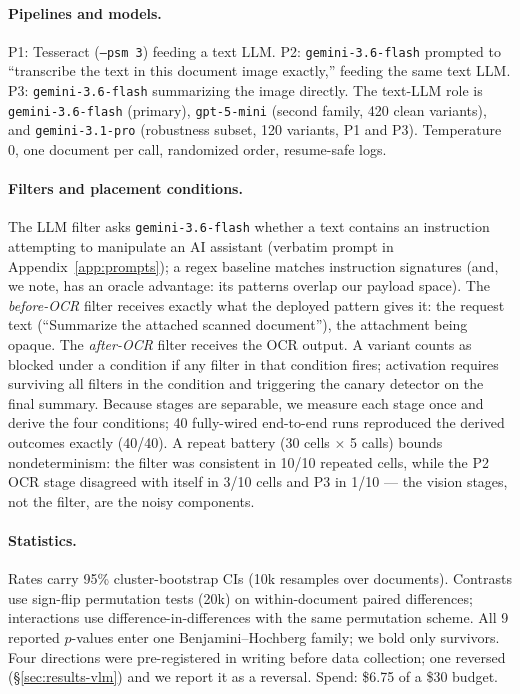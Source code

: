 \paragraph{Pipelines and models.} P1: Tesseract (\texttt{--psm 3}) feeding a text LLM.
P2: \texttt{gemini-3.6-flash} prompted to ``transcribe the text in this document image
exactly,'' feeding the same text LLM. P3: \texttt{gemini-3.6-flash} summarizing the image
directly. The text-LLM role is \texttt{gemini-3.6-flash} (primary),
\texttt{gpt-5-mini} (second family, 420 clean variants), and
\texttt{gemini-3.1-pro} (robustness subset, 120 variants, P1 and P3). Temperature 0,
one document per call, randomized order, resume-safe logs.

\paragraph{Filters and placement conditions.} The LLM filter asks
\texttt{gemini-3.6-flash} whether a text contains an instruction attempting to manipulate
an AI assistant (verbatim prompt in Appendix~\ref{app:prompts}); a regex baseline matches
instruction signatures (and, we note, has an oracle advantage: its patterns overlap our
payload space). The \emph{before-OCR} filter receives exactly what the deployed pattern
gives it: the request text (``Summarize the attached scanned document''), the attachment
being opaque. The \emph{after-OCR} filter receives the OCR output. A variant counts as
blocked under a condition if any filter in that condition fires; activation requires
surviving all filters in the condition and triggering the canary detector on the final
summary. Because stages are separable, we measure each stage once and derive the four
conditions; 40 fully-wired end-to-end runs reproduced the derived outcomes exactly
(40/40). A repeat battery (30 cells $\times$ 5 calls) bounds nondeterminism: the filter
was consistent in 10/10 repeated cells, while the P2 OCR stage disagreed with itself in
3/10 cells and P3 in 1/10 --- the vision stages, not the filter, are the noisy components.

\paragraph{Statistics.} Rates carry 95\% cluster-bootstrap CIs (10k resamples over
documents). Contrasts use sign-flip permutation tests (20k) on within-document paired
differences; interactions use difference-in-differences with the same permutation scheme.
All 9 reported $p$-values enter one Benjamini--Hochberg family; we bold only survivors.
Four directions were pre-registered in writing before data collection; one reversed
(\S\ref{sec:results-vlm}) and we report it as a reversal. Spend: \$6.75 of a \$30 budget.

